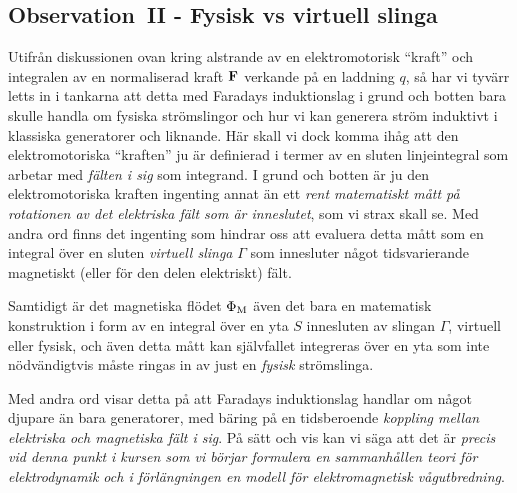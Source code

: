 {{{{\subsection{Observation~II - Fysisk vs virtuell slinga}
Utifr{\aa}n diskussionen ovan kring alstrande av en elektromotorisk ``kraft''
och integralen av en normaliserad kraft ${\bf F}$ verkande p{\aa} en laddning
$q$, s{\aa} har vi tyv{\"a}rr letts in i tankarna att detta med Faradays
induktionslag i grund och botten bara skulle handla om fysiska str{\"o}mslingor
och hur vi kan generera str{\"o}m induktivt i klassiska generatorer och
liknande. H{\"a}r skall vi dock komma ih{\aa}g att den elektromotoriska
``kraften'' ju {\"a}r definierad i termer av en sluten linjeintegral som
arbetar med {\it f{\"a}lten i sig} som integrand. I grund och botten {\"a}r
ju den elektromotoriska kraften ingenting annat {\"a}n ett {\it rent
matematiskt m{\aa}tt p{\aa} rotationen av det elektriska f{\"a}lt som
{\"a}r inneslutet}, som vi strax skall se.
Med andra ord finns det ingenting som hindrar oss att evaluera detta m{\aa}tt
som en integral {\"o}ver en sluten {\it virtuell slinga} $\Gamma$ som
innesluter n{\aa}got tidsvarierande magnetiskt (eller f{\"o}r den delen
elektriskt) f{\"a}lt.

Samtidigt {\"a}r det magnetiska fl{\"o}det $\Phi_{\rm M}$ {\"a}ven det bara en
matematisk konstruktion i form av en integral {\"o}ver en yta $S$ innesluten
av slingan $\Gamma$, virtuell eller fysisk, och {\"a}ven detta m{\aa}tt kan
sj{\"a}lvfallet integreras {\"o}ver en yta som inte n{\"o}dv{\"a}ndigtvis
m{\aa}ste ringas in av just en {\it fysisk} str{\"o}mslinga.

Med andra ord visar detta p{\aa} att Faradays induktionslag handlar om n{\aa}got
djupare {\"a}n bara generatorer, med b{\"a}ring p{\aa} en tidsberoende
{\it koppling mellan elektriska och magnetiska f{\"a}lt i sig}.
P{\aa} s{\"a}tt och vis kan vi s{\"a}ga att det {\"a}r {\it precis vid denna
punkt i kursen som vi b{\"o}rjar formulera en sammanh{\aa}llen teori f{\"o}r
elektrodynamik och i f{\"o}rl{\"a}ngningen en modell f{\"o}r elektromagnetisk
v{\aa}gutbredning}.

}}}}
